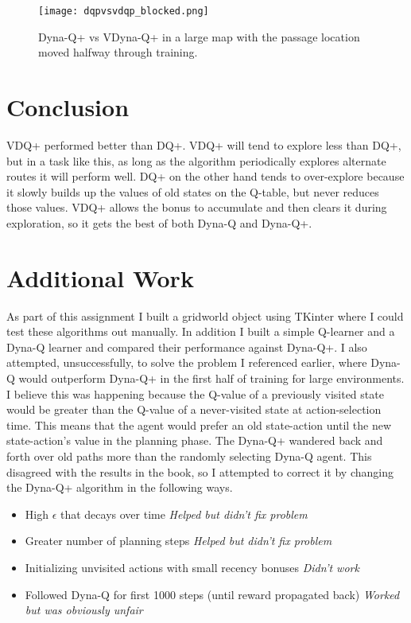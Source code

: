 \documentclass{article}
\begin{document}
  \begin{figure}[H]
    \centering
        \texttt{[image: dqpvsvdqp\_blocked.png]}
    \caption{Dyna-Q+ vs VDyna-Q+ in a large map with the passage location moved halfway through training.}
    \label{}
\end{figure}

\section{Conclusion}

VDQ+ performed better than DQ+. VDQ+ will tend to explore less than DQ+, but in a task like this, as long as the algorithm periodically explores alternate routes it will perform well. DQ+ on the other hand tends to over-explore because it slowly builds up the values of old states on the Q-table, but never reduces those values. VDQ+ allows the bonus to accumulate and then clears it during exploration, so it gets the best of both Dyna-Q and Dyna-Q+.

\section{Additional Work}

As part of this assignment I built a gridworld object using TKinter where I could test these algorithms out manually. In addition I built a simple Q-learner and a Dyna-Q learner and compared their performance against Dyna-Q+. I also attempted, unsuccessfully, to solve the problem I referenced earlier, where Dyna-Q would outperform Dyna-Q+ in the first half of training for large environments. I believe this was happening because the Q-value of a previously visited state would be greater than the Q-value of a never-visited state at action-selection time. This means that the agent would prefer an old state-action until the new state-action's value in the planning phase. The Dyna-Q+ wandered back and forth over old paths more than the randomly selecting Dyna-Q agent. This disagreed with the results in the book, so I attempted to correct it by changing the Dyna-Q+ algorithm in the following ways. 

\begin{itemize}
    \item High $\epsilon$ that decays over time \textit{Helped but didn't fix problem}
    \item Greater number of planning steps \textit{Helped but didn't fix problem}
    \item Initializing unvisited actions with small recency bonuses \textit{Didn't work}
    \item Followed Dyna-Q for first 1000 steps (until reward propagated back) \textit{Worked but was obviously unfair}
\end{itemize}
\end{document}
